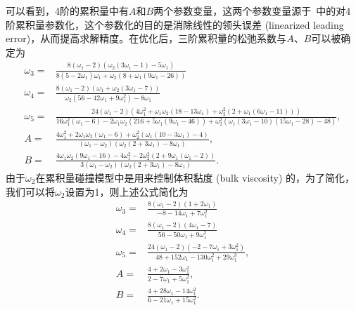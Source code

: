 可以看到，4阶的累积量中有$A$和$B$两个参数变量，这两个参数变量源于~\cite{Geier-2017}中的对4阶累积量参数化，这个参数化的目的是消除线性的领头误差 (linearized leading error)，从而提高求解精度。在优化后，三阶累积量的松弛系数与$A$、$B$可以被确定为
\begin{align*}
\omega_{3} =& \frac{8\left(\omega_{1}-2\right)\left(\omega_{2}\left(3 \omega_{1}-1\right)-5 \omega_{1}\right)}{8\left(5-2 \omega_{1}\right) \omega_{1}+\omega_{2}\left(8+\omega_{1}\left(9 \omega_{1}-26\right)\right)} \\
\omega_{4} =& \frac{8\left(\omega_{1}-2\right)\left(\omega_{1}+\omega_{2}\left(3 \omega_{1}-7\right)\right)}{\omega_{2}\left(56-42 \omega_{1}+9 \omega_{1}^{2}\right)-8 \omega_{1}} \\
\omega_{5} =& \frac{24\left(\omega_{1}-2\right)\left(4 \omega_{1}^{2}+\omega_{1} \omega_{2}\left(18-13 \omega_{1}\right)+\omega_{2}^{2}\left(2+\omega_{1}\left(6 \omega_{1}-11\right)\right)\right)}{16 \omega_{1}^{2}\left(\omega_{1}-6\right)-2 \omega_{1} \omega_{2}\left(216+5 \omega_{1}\left(9 \omega_{1}-46\right)\right)+\omega_{2}^{2}\left(\omega_{1}\left(3 \omega_{1}-10\right)\left(15 \omega_{1}-28\right)-48\right)}, \\
A =& \frac{4 \omega_{1}^{2}+2 \omega_{1} \omega_{2}\left(\omega_{1}-6\right)+\omega_{2}^{2}\left(\omega_{1}\left(10-3 \omega_{1}\right)-4\right)}{\left(\omega_{1}-\omega_{2}\right)\left(\omega_{2}\left(2+3 \omega_{1}\right)-8 \omega_{1}\right)}, \\
B = & \frac{4 \omega_{1} \omega_{2}\left(9 \omega_{1}-16\right)-4 \omega_{1}^{2}-2 \omega_{2}^{2}\left(2+9 \omega_{1}\left(\omega_{1}-2\right)\right)}{3\left(\omega_{1}-\omega_{2}\right)\left(\omega_{2}\left(2+3 \omega_{1}\right)-8 \omega_{1}\right)} .
\end{align*}
由于$\omega_{2}$在累积量碰撞模型中是用来控制体积黏度 (bulk viscosity) 的，为了简化，我们可以将$\omega_{2}$设置为1，则上述公式简化为
\begin{align*}
    \omega_{3} =& \frac{8\left(\omega_{1}-2\right)\left(1+2 \omega_{1}\right)}{-8-14\omega_{1}+7\omega_{1}^2} \\
    \omega_{4} =& \frac{8\left(\omega_{1}-2\right)\left(4 \omega_{1}-7\right)}{56-50\omega_{1}+9\omega_{1}^2} \\
    \omega_{5} =& \frac{24\left(\omega_{1}-2\right)\left(-2-7\omega_{1}+3\omega_{1}^2\right)}{48+152\omega_{1}-130\omega_{1}^2+29\omega_{1}^3}, \\
    A =& \frac{4+2\omega_{1}-3\omega_{1}^2}{2-7\omega_{1}+5\omega_{1}^2}, \\
    B =& \frac{4+28\omega_{1}-14\omega_{1}^2}{6-21\omega_{1}+15\omega_{1}^2} .
\end{align*}

